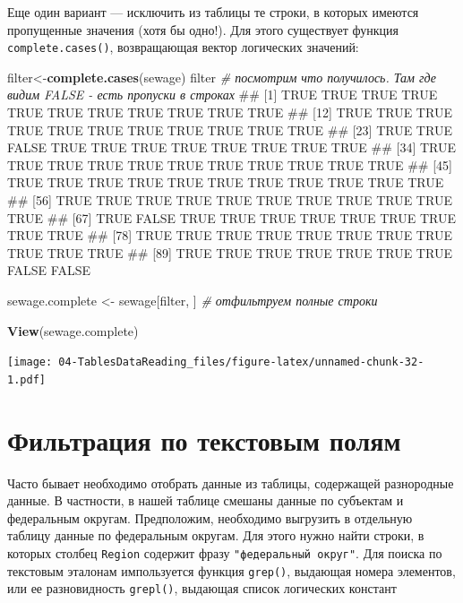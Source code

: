 \documentclass[]{book}
\newenvironment{Shaded}{\begin{snugshade}}{\end{snugshade}}
\newcommand{\KeywordTok}[1]{\textcolor[rgb]{0.13,0.29,0.53}{\textbf{#1}}}
\newcommand{\StringTok}[1]{\textcolor[rgb]{0.31,0.60,0.02}{#1}}
\newcommand{\CommentTok}[1]{\textcolor[rgb]{0.56,0.35,0.01}{\textit{#1}}}
\newcommand{\NormalTok}[1]{#1}
\begin{document}
Еще один вариант --- исключить из таблицы те строки, в которых имеются
пропущенные значения (хотя бы одно!). Для этого существует функция
\texttt{complete.cases()}, возвращающая вектор логических значений:

\begin{Shaded}
\begin{Highlighting}[]
\NormalTok{filter<-}\KeywordTok{complete.cases}\NormalTok{(sewage)}
\NormalTok{filter  }\CommentTok{# посмотрим что получилось. Там где видим FALSE - есть пропуски в строках}
\NormalTok{##  [1]  TRUE  TRUE  TRUE  TRUE  TRUE  TRUE  TRUE  TRUE  TRUE  TRUE  TRUE}
\NormalTok{## [12]  TRUE  TRUE  TRUE  TRUE  TRUE  TRUE  TRUE  TRUE  TRUE  TRUE  TRUE}
\NormalTok{## [23]  TRUE  TRUE FALSE  TRUE  TRUE  TRUE  TRUE  TRUE  TRUE  TRUE  TRUE}
\NormalTok{## [34]  TRUE  TRUE  TRUE  TRUE  TRUE  TRUE  TRUE  TRUE  TRUE  TRUE  TRUE}
\NormalTok{## [45]  TRUE  TRUE  TRUE  TRUE  TRUE  TRUE  TRUE  TRUE  TRUE  TRUE  TRUE}
\NormalTok{## [56]  TRUE  TRUE  TRUE  TRUE  TRUE  TRUE  TRUE  TRUE  TRUE  TRUE  TRUE}
\NormalTok{## [67]  TRUE FALSE  TRUE  TRUE  TRUE  TRUE  TRUE  TRUE  TRUE  TRUE  TRUE}
\NormalTok{## [78]  TRUE  TRUE  TRUE  TRUE  TRUE  TRUE  TRUE  TRUE  TRUE  TRUE  TRUE}
\NormalTok{## [89]  TRUE  TRUE  TRUE  TRUE  TRUE  TRUE  TRUE FALSE FALSE}

\NormalTok{sewage.complete <-}\StringTok{ }\NormalTok{sewage[filter, ] }\CommentTok{# отфильтруем полные строки}
\end{Highlighting}
\end{Shaded}

\begin{Shaded}
\begin{Highlighting}[]
\KeywordTok{View}\NormalTok{(sewage.complete)}
\end{Highlighting}
\end{Shaded}

\texttt{[image: 04-TablesDataReading\_files/figure-latex/unnamed-chunk-32-1.pdf]}

\section{Фильтрация по текстовым полям}\label{filtering_text}

Часто бывает необходимо отобрать данные из таблицы, содержащей
разнородные данные. В частности, в нашей таблице смешаны данные по
субъектам и федеральным округам. Предположим, необходимо выгрузить в
отдельную таблицу данные по федеральным округам. Для этого нужно найти
строки, в которых столбец \texttt{Region} содержит фразу
\texttt{"федеральный\ округ"}. Для поиска по текстовым эталонам
импользуется функция \texttt{grep()}, выдающая номера элементов, или ее
разновидность \texttt{grepl()}, выдающая список логических констант
\end{document}
